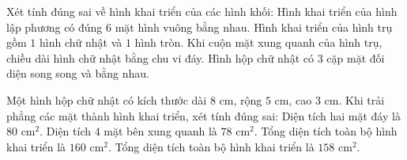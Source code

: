 \begin{ex} %
Xét tính đúng sai về hình khai triển của các hình khối:
\choiceTF
{\True Hình khai triển của hình lập phương có đúng $6$ mặt hình vuông bằng nhau.}
{Hình khai triển của hình trụ gồm $1$ hình chữ nhật và $1$ hình tròn.}
{\True Khi cuộn mặt xung quanh của hình trụ, chiều dài hình chữ nhật bằng chu vi đáy.}
{\True Hình hộp chữ nhật có $3$ cặp mặt đối diện song song và bằng nhau.}
\end{ex}

\begin{ex} %
Một hình hộp chữ nhật có kích thước dài $8\text{ cm}$, rộng $5\text{ cm}$, cao $3\text{ cm}$. Khi trải phẳng các mặt thành hình khai triển, xét tính đúng sai:
\choiceTF
{\True Diện tích hai mặt đáy là $80\text{ cm}^2$.}
{\True Diện tích $4$ mặt bên xung quanh là $78\text{ cm}^2$.}
{Tổng diện tích toàn bộ hình khai triển là $160\text{ cm}^2$.}
{\True Tổng diện tích toàn bộ hình khai triển là $158\text{ cm}^2$.}
\end{ex}


